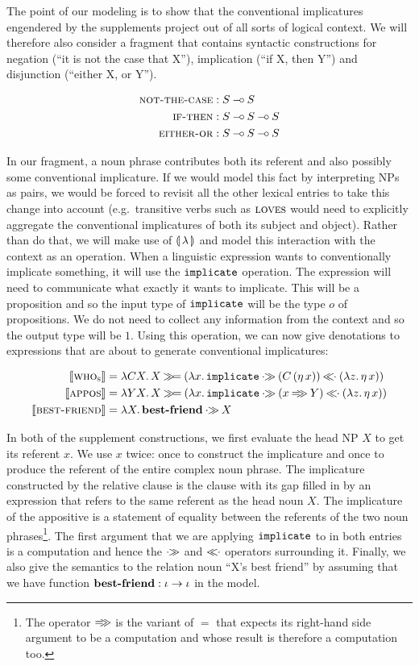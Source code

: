 The point of our modeling is to show that the conventional implicatures
engendered by the supplements project out of all sorts of logical
context. We will therefore also consider a fragment that contains syntactic
constructions for negation (``it is not the case that X''), implication
(``if X, then Y'') and disjunction (``either X, or Y'').

\begin{align*}
  \textsc{not-the-case} &: S \mathbin{{-}\mkern-3.5mu{\circ}} S \\
  \textsc{if-then} &: S \mathbin{{-}\mkern-3.5mu{\circ}} S \mathbin{{-}\mkern-3.5mu{\circ}} S \\
  \textsc{either-or} &: S \mathbin{{-}\mkern-3.5mu{\circ}} S \mathbin{{-}\mkern-3.5mu{\circ}} S
\end{align*}

In our fragment, a noun phrase contributes both its referent and also
possibly some conventional implicature. If we would model this fact by
interpreting NPs as pairs, we would be forced to revisit all the other
lexical entries to take this change into account (e.g.\ transitive verbs
such as $\textsc{loves}$ would need to explicitly aggregate the conventional
implicatures of both its subject and object). Rather than do that, we will
make use of $\llparenthesis \, \lambda \, \rrparenthesis$ and model this interaction with the context
as an operation. When a linguistic expression wants to conventionally
implicate something, it will use the $\mathtt{implicate}$ operation. The
expression will need to communicate what exactly it wants to
implicate. This will be a proposition and so the input type of
$\mathtt{implicate}$ will be the type $o$ of propositions. We do not need to
collect any information from the context and so the output type will be
$1$. Using this operation, we can now give denotations to expressions that
are about to generate conventional implicatures:

\begin{align*}
  \sem{\abs{who}_{\abs{s}}} &= \lam{C X}{X \hsbind (\lam{x}{\op{implicate} \apr (\ap{C}{(\etaE{x})}) \apl (\lam{z}{\etaE{x}})})} \\
  \lex{appos}{\lam{Y X}{X \hsbind (\lam{x}{\op{implicate} \apr (x \eqr Y) \apl (\lam{z}{\etaE{x}})})}} \\
  \lex{best-friend}{\lam{X}{\obj{best-friend} \apr X}}
\end{align*}

In both of the supplement constructions, we first evaluate the head NP $X$
to get its referent $x$. We use $x$ twice: once to construct the
implicature and once to produce the referent of the entire complex noun
phrase. The implicature constructed by the relative clause is the clause
with its gap filled in by an expression that refers to the same referent as
the head noun $X$. The implicature of the appositive is a statement of
equality between the referents of the two noun phrases\footnote{The
  operator $\mathbin{=\!\!\gg}$ is the variant of $=$ that expects its right-hand side
  argument to be a computation and whose result is therefore a computation
  too.}. The first argument that we are applying $\mathtt{implicate}$ to in
both entries is a computation and hence the $\mathbin{\cdot\!\!\gg}$ and $\mathbin{\ll\!\!\cdot}$ operators
surrounding it. Finally, we also give the semantics to the relation noun
``X's best friend'' by assuming that we have function
$\textbf{best-friend} : \iota \to \iota$ in the model.

